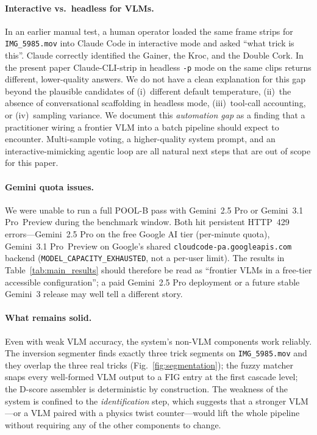 \paragraph{Interactive vs.\ headless for VLMs.}
In an earlier manual test, a human operator loaded the same frame
strips for \texttt{IMG\_5985.mov} into Claude Code in interactive
mode and asked ``what trick is this''. Claude correctly identified
the Gainer, the Kroc, and the Double Cork. In the present paper
Claude-CLI-strip in headless \texttt{-p} mode on the same clips
returns different, lower-quality answers. We do not have a clean
explanation for this gap beyond the plausible candidates of
(i)~different default temperature, (ii)~the absence of
conversational scaffolding in headless mode,
(iii)~tool-call accounting, or (iv)~sampling variance. We
document this \emph{automation gap} as a finding that a practitioner
wiring a frontier VLM into a batch pipeline should expect to
encounter. Multi-sample voting, a higher-quality system prompt, and
an interactive-mimicking agentic loop are all natural next steps
that are out of scope for this paper.

\paragraph{Gemini quota issues.}
We were unable to run a full POOL-B pass with Gemini~2.5 Pro or
Gemini~3.1 Pro~Preview during the benchmark window. Both hit
persistent HTTP~429 errors---Gemini~2.5 Pro on the free Google AI
tier (per-minute quota), Gemini~3.1 Pro~Preview on Google's shared
\texttt{cloudcode-pa.googleapis.com} backend
(\texttt{MODEL\_CAPACITY\_EXHAUSTED}, not a per-user limit). The
results in Table~\ref{tab:main_results} should therefore be read as
``frontier VLMs in a free-tier accessible configuration''; a paid
Gemini~2.5 Pro deployment or a future stable Gemini~3 release may
well tell a different story.

\paragraph{What remains solid.}
Even with weak VLM accuracy, the system's non-VLM components work
reliably. The inversion segmenter finds exactly three trick segments
on \texttt{IMG\_5985.mov} and they overlap the three real tricks
(Fig.~\ref{fig:segmentation}); the fuzzy matcher snaps every
well-formed VLM output to a FIG entry at the first cascade level;
the D-score assembler is deterministic by construction. The
weakness of the system is confined to the \emph{identification}
step, which suggests that a stronger VLM---or a VLM paired with
a physics twist counter---would lift the whole pipeline without
requiring any of the other components to change.
